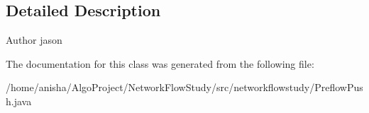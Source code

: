 \subsection{Detailed Description}
\begin{DoxyAuthor}{Author}
jason 
\end{DoxyAuthor}


The documentation for this class was generated from the following file\+:\begin{DoxyCompactItemize}
\item 
/home/anisha/\+Algo\+Project/\+Network\+Flow\+Study/src/networkflowstudy/Preflow\+Push.\+java\end{DoxyCompactItemize}
